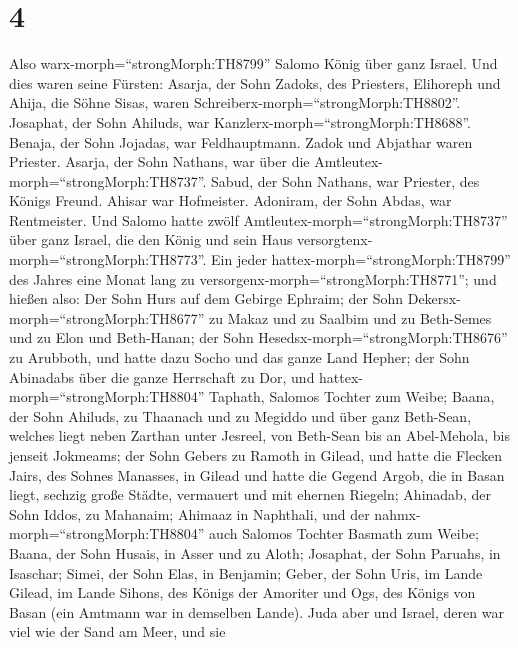 \hypertarget{section-3}{%
\section{4}\label{section-3}}

 Also warx-morph=``strongMorph:TH8799'' Salomo König über
ganz Israel.  Und dies waren seine Fürsten: Asarja, der Sohn
Zadoks, des Priesters,  Elihoreph und Ahija, die Söhne
Sisas, waren Schreiberx-morph=``strongMorph:TH8802''. Josaphat, der Sohn
Ahiluds, war Kanzlerx-morph=``strongMorph:TH8688''.  Benaja,
der Sohn Jojadas, war Feldhauptmann. Zadok und Abjathar waren Priester.
 Asarja, der Sohn Nathans, war über die
Amtleutex-morph=``strongMorph:TH8737''. Sabud, der Sohn Nathans, war
Priester, des Königs Freund.  Ahisar war Hofmeister.
Adoniram, der Sohn Abdas, war Rentmeister.  Und Salomo hatte
zwölf Amtleutex-morph=``strongMorph:TH8737'' über ganz Israel, die den
König und sein Haus versorgtenx-morph=``strongMorph:TH8773''. Ein jeder
hattex-morph=``strongMorph:TH8799'' des Jahres eine Monat lang zu
versorgenx-morph=``strongMorph:TH8771'';  und hießen also:
Der Sohn Hurs auf dem Gebirge Ephraim;  der Sohn
Dekersx-morph=``strongMorph:TH8677'' zu Makaz und zu Saalbim und zu
Beth-Semes und zu Elon und Beth-Hanan;  der Sohn
Hesedsx-morph=``strongMorph:TH8676'' zu Arubboth, und hatte dazu Socho
und das ganze Land Hepher;  der Sohn Abinadabs über die
ganze Herrschaft zu Dor, und hattex-morph=``strongMorph:TH8804''
Taphath, Salomos Tochter zum Weibe;  Baana, der Sohn
Ahiluds, zu Thaanach und zu Megiddo und über ganz Beth-Sean, welches
liegt neben Zarthan unter Jesreel, von Beth-Sean bis an Abel-Mehola, bis
jenseit Jokmeams;  der Sohn Gebers zu Ramoth in Gilead, und
hatte die Flecken Jairs, des Sohnes Manasses, in Gilead und hatte die
Gegend Argob, die in Basan liegt, sechzig große Städte, vermauert und
mit ehernen Riegeln;  Ahinadab, der Sohn Iddos, zu
Mahanaim;  Ahimaaz in Naphthali, und der
nahmx-morph=``strongMorph:TH8804'' auch Salomos Tochter Basmath zum
Weibe;  Baana, der Sohn Husais, in Asser und zu Aloth;
 Josaphat, der Sohn Paruahs, in Isaschar; 
Simei, der Sohn Elas, in Benjamin;  Geber, der Sohn Uris,
im Lande Gilead, im Lande Sihons, des Königs der Amoriter und Ogs, des
Königs von Basan (ein Amtmann war in demselben Lande). 
Juda aber und Israel, deren war viel wie der Sand am Meer, und sie
